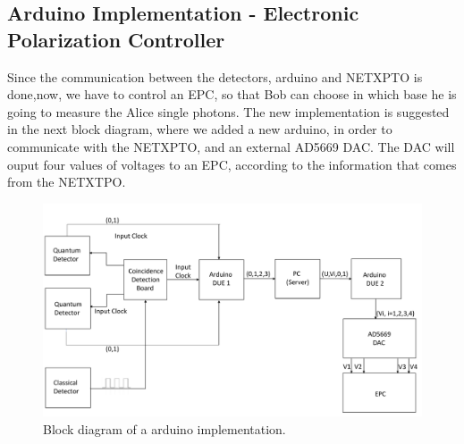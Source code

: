 \begin{refsection}
	\clearpage
	
	\subsection{Arduino Implementation - Electronic Polarization Controller }
	Since the communication between the detectors, arduino and NETXPTO is done,now, we have to control an EPC, so that Bob can choose in which base he is going to measure the Alice single photons. The new implementation is suggested in the next block diagram, where we added a new arduino, in order to communicate with the NETXPTO, and an external AD5669 DAC. The DAC will ouput four values of voltages to an EPC, according to the information that comes from the NETXTPO.
	\begin{figure}[H]
		\centering
		\includegraphics[width=1\linewidth]{./sdf/arduino_quantum_rx/figures/Ard.pdf}
		\caption{Block diagram of a arduino implementation.}
		\label{fig:netxpto}
		
	\end{figure}


\end{refsection}

